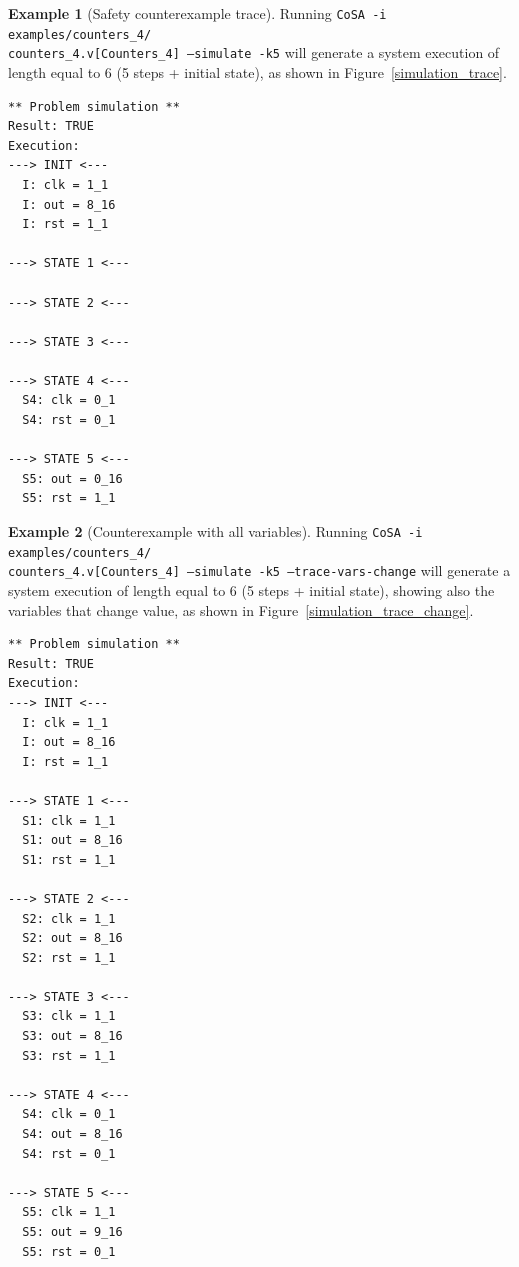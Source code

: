 \documentclass{article}
\theoremstyle{definition}
\newtheorem{example}{Example}[section]
\begin{document}
\begin{example}[Safety counterexample trace]
  Running \texttt{CoSA -i examples/counters\_4/\\counters\_4.v[Counters\_4] --simulate -k5}
  will generate a system execution of length equal to 6 (5 steps + initial state), as
  shown in Figure~\ref{simulation_trace}.

\begin{lstlisting}[frame=single,language=ets,caption=Simulation Counter\_4 ,label=simulation_trace]
** Problem simulation **
Result: TRUE
Execution:
---> INIT <---
  I: clk = 1_1
  I: out = 8_16
  I: rst = 1_1

---> STATE 1 <---

---> STATE 2 <---

---> STATE 3 <---

---> STATE 4 <---
  S4: clk = 0_1
  S4: rst = 0_1

---> STATE 5 <---
  S5: out = 0_16
  S5: rst = 1_1
\end{lstlisting}

\end{example}

\begin{example}[Counterexample with all variables]
  Running \texttt{CoSA -i
    examples/counters\_4/\\counters\_4.v[Counters\_4] --simulate -k5
    --trace-vars-change} will generate a system execution of length
  equal to 6 (5 steps + initial state), showing also the variables
  that change value, as shown in Figure~\ref{simulation_trace_change}.

\begin{lstlisting}[frame=single,language=ets,caption=Simulation Counter\_4 (with changing values),label=simulation_trace_change]
** Problem simulation **
Result: TRUE
Execution:
---> INIT <---
  I: clk = 1_1
  I: out = 8_16
  I: rst = 1_1

---> STATE 1 <---
  S1: clk = 1_1
  S1: out = 8_16
  S1: rst = 1_1

---> STATE 2 <---
  S2: clk = 1_1
  S2: out = 8_16
  S2: rst = 1_1

---> STATE 3 <---
  S3: clk = 1_1
  S3: out = 8_16
  S3: rst = 1_1

---> STATE 4 <---
  S4: clk = 0_1
  S4: out = 8_16
  S4: rst = 0_1

---> STATE 5 <---
  S5: clk = 1_1
  S5: out = 9_16
  S5: rst = 0_1
\end{lstlisting}

\end{example}
\end{document}
